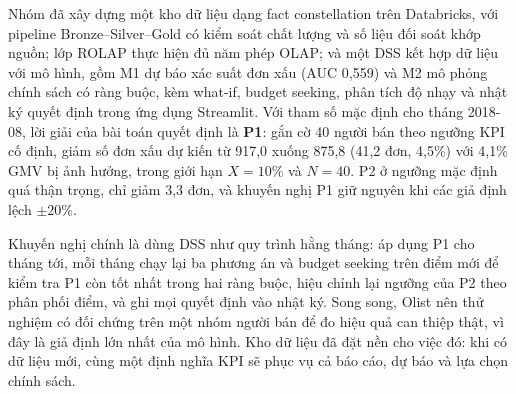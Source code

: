 \documentclass[a4paper]{article}
\begin{document}
Nhóm đã xây dựng một kho dữ liệu dạng fact constellation trên Databricks, với pipeline Bronze--Silver--Gold có kiểm soát chất lượng và số liệu đối soát khớp nguồn; lớp ROLAP thực hiện đủ năm phép OLAP; và một DSS kết hợp dữ liệu với mô hình, gồm M1 dự báo xác suất đơn xấu (AUC 0,559) và M2 mô phỏng chính sách có ràng buộc, kèm what-if, budget seeking, phân tích độ nhạy và nhật ký quyết định trong ứng dụng Streamlit. Với tham số mặc định cho tháng 2018-08, lời giải của bài toán quyết định là \textbf{P1}: gắn cờ 40 người bán theo ngưỡng KPI cố định, giảm số đơn xấu dự kiến từ 917,0 xuống 875,8 (41,2 đơn, 4,5\%) với 4,1\% GMV bị ảnh hưởng, trong giới hạn $X = 10\%$ và $N = 40$. P2 ở ngưỡng mặc định quá thận trọng, chỉ giảm 3,3 đơn, và khuyến nghị P1 giữ nguyên khi các giả định lệch $\pm 20\%$.

Khuyến nghị chính là dùng DSS như quy trình hằng tháng: áp dụng P1 cho tháng tới, mỗi tháng chạy lại ba phương án và budget seeking trên điểm mới để kiểm tra P1 còn tốt nhất trong hai ràng buộc, hiệu chỉnh lại ngưỡng của P2 theo phân phối điểm, và ghi mọi quyết định vào nhật ký. Song song, Olist nên thử nghiệm có đối chứng trên một nhóm người bán để đo hiệu quả can thiệp thật, vì đây là giả định lớn nhất của mô hình. Kho dữ liệu đã đặt nền cho việc đó: khi có dữ liệu mới, cùng một định nghĩa KPI sẽ phục vụ cả báo cáo, dự báo và lựa chọn chính sách.
\end{document}
